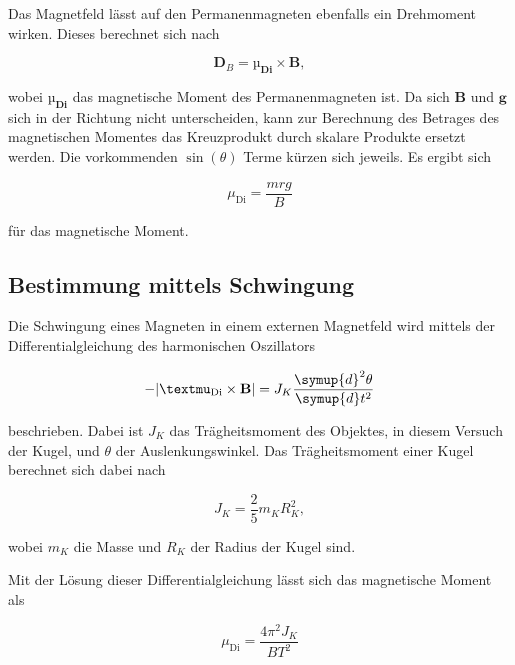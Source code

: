 Das Magnetfeld lässt auf den Permanenmagneten ebenfalls ein Drehmoment wirken. Dieses berechnet sich nach

\begin{equation}
    \label{eqn:dreh-magn}
    \mathbf{D}_B = \mathbf{µ_\text{Di}} \times \mathbf{B},
\end{equation}

wobei $\mathbf{µ_\text{Di}}$ das magnetische Moment des Permanenmagneten ist.
Da sich $\mathbf{B}$ und $\mathbf{g}$ sich in der Richtung nicht unterscheiden, kann zur Berechnung des Betrages des magnetischen Momentes das Kreuzprodukt durch skalare Produkte ersetzt werden. Die vorkommenden $\sin( \theta )$ Terme kürzen sich jeweils.
Es ergibt sich 

\begin{equation}
    \label{eqn:magn-grav}
    \mu_\text{Di} = \frac{m r g}{B}
\end{equation}

für das magnetische Moment.


\subsection{Bestimmung mittels Schwingung}

Die Schwingung eines Magneten in einem externen Magnetfeld wird mittels der Differentialgleichung des harmonischen Oszillators

\begin{equation}
    \label{eqn:harm-osz}
    -|\mathbf{µ}_\text{Di} \times \mathbf{B}| = J_K \frac{\symup{d}^2 \theta}{\symup{d}t^2}
\end{equation}

beschrieben. Dabei ist $J_K$ das Trägheitsmoment des Objektes, in diesem Versuch der Kugel, und $\theta$ der Auslenkungswinkel.
Das Trägheitsmoment einer Kugel berechnet sich dabei nach

\begin{equation}
    J_K = \frac{2}{5} m_K R_K^2, 
\end{equation}

wobei $m_K$ die Masse und $R_K$ der Radius der Kugel sind.

Mit der Lösung dieser Differentialgleichung lässt sich das magnetische Moment als

\begin{equation}
    \label{eqn:magn-schwing}
    \mu_\text{Di} = \frac{4 \pi^2 J_K}{B T^2}
\end{equation}

